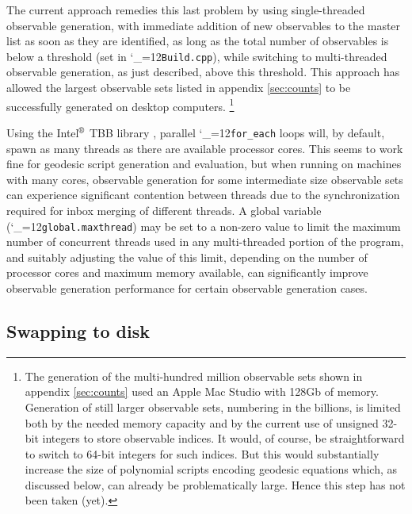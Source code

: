 \documentclass [12pt]{article}
\makeatletter
\renewcommand{\tt}{\begingroup\catcode`_=12\def\_{\string_}\tt@}
\newcommand{\tt@}[1]{\texttt{#1}\endgroup}
\makeatother
\begin{document}
The current approach remedies this last problem by using
single-threaded observable generation, with immediate
addition of new observables to the master list as soon
as they are identified, as long as the total number of
observables is below a threshold (set in \tt{Build.cpp}),
while switching to multi-threaded observable generation,
as just described, above this threshold.
This approach has allowed the largest observable sets listed
in appendix \ref{sec:counts} to be successfully generated
on desktop computers.%
\footnote
    {%
    The generation of the multi-hundred million observable sets
    shown in appendix \ref{sec:counts} used an
    Apple Mac Studio with 128Gb of memory.
    Generation of still larger observable sets,
    numbering in the billions, is limited
    both by the needed memory capacity and by
    the current use of unsigned 32-bit integers
    to store observable indices.
    It would, of course, be straightforward to
    switch to 64-bit integers for such indices.
    But this would substantially increase the size
    of polynomial scripts encoding geodesic equations 
    which, as discussed below,
    can already be problematically large.
    Hence this step has not been taken (yet).
    }

Using the Intel$^{\text{\textregistered}}$ TBB library
\cite{IntelTBB}, parallel \tt{for_each} loops will, by default,
spawn as many threads as there are available processor cores.
This seems to work fine for geodesic script generation
and evaluation, but
when running on machines with many cores,
observable generation
for some intermediate size observable sets
can experience significant contention between
threads due to the synchronization required
for inbox merging of different threads.
A global variable (\tt{global.maxthread})
may be set to a non-zero value to limit
the maximum number of concurrent threads
used in any multi-threaded portion
of the program, and
suitably adjusting the value of this limit,
depending on the number of processor cores and
maximum memory available, can significantly 
improve observable generation performance for certain
observable generation cases.

\subsection{Swapping to disk}
\end{document}
